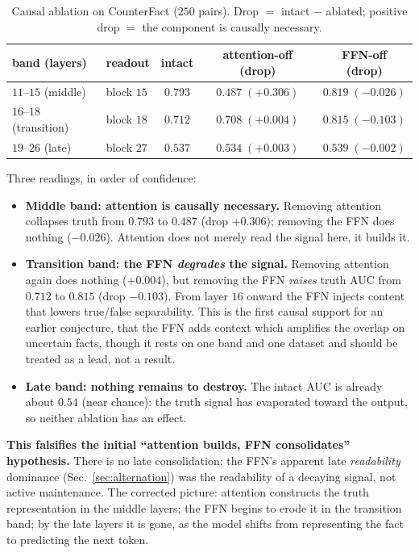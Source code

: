 \documentclass[11pt]{article}
\begin{document}
\begin{table}[h]
\centering
\caption{Causal ablation on CounterFact ($250$ pairs). Drop $=$ intact $-$
ablated; positive drop $=$ the component is causally necessary.}
\label{tab:abl}
\begin{tabular}{llccc}
\toprule
band (layers) & readout & intact & attention-off (drop) & FFN-off (drop) \\
\midrule
$11$--$15$ (middle)     & block $15$ & $0.793$ & $0.487\;(+0.306)$ & $0.819\;(-0.026)$ \\
$16$--$18$ (transition) & block $18$ & $0.712$ & $0.708\;(+0.004)$ & $0.815\;(-0.103)$ \\
$19$--$26$ (late)       & block $27$ & $0.537$ & $0.534\;(+0.003)$ & $0.539\;(-0.002)$ \\
\bottomrule
\end{tabular}
\end{table}

Three readings, in order of confidence:
\begin{itemize}
\item \textbf{Middle band: attention is causally necessary.} Removing
attention collapses truth from $0.793$ to $0.487$ (drop $+0.306$); removing
the FFN does nothing ($-0.026$). Attention does not merely read the signal
here, it builds it.
\item \textbf{Transition band: the FFN \emph{degrades} the signal.} Removing
attention again does nothing ($+0.004$), but removing the FFN \emph{raises}
truth AUC from $0.712$ to $0.815$ (drop $-0.103$). From layer $16$ onward the
FFN injects content that lowers true/false separability. This is the first
causal support for an earlier conjecture, that the FFN adds context which
amplifies the overlap on uncertain facts, though it rests on one band and one
dataset and should be treated as a lead, not a result.
\item \textbf{Late band: nothing remains to destroy.} The intact AUC is
already about $0.54$ (near chance): the truth signal has evaporated toward
the output, so neither ablation has an effect.
\end{itemize}

\textbf{This falsifies the initial ``attention builds, FFN consolidates''
hypothesis.} There is no late consolidation; the FFN's apparent late
\emph{readability} dominance (Sec.~\ref{sec:alternation}) was the readability
of a decaying signal, not active maintenance. The corrected picture: attention
constructs the truth representation in the middle layers; the FFN begins to
erode it in the transition band; by the late layers it is gone, as the model
shifts from representing the fact to predicting the next token.
\end{document}
